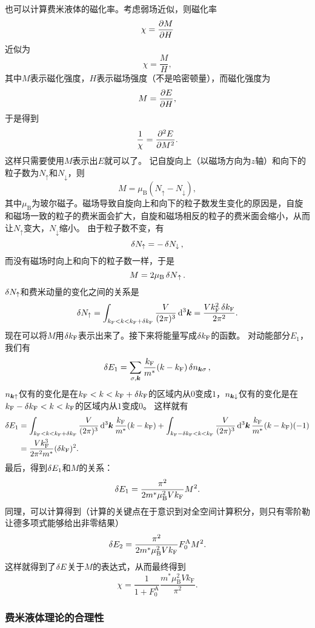 \documentclass[hyperref, UTF8, a4paper]{ctexart}
\begin{document}
也可以计算费米液体的磁化率。考虑弱场近似，则磁化率
\[
    \chi = \pdv{M}{H}
\]
近似为
\[
    \chi = \frac{M}{H},
\]
其中$M$表示磁化强度，$H$表示磁场强度（不是哈密顿量），而磁化强度为
\[
    M = \pdv{E}{H},
\]
于是得到
\[
    \frac{1}{\chi} = \pdv[2]{E}{M}.
\]
这样只需要使用$M$表示出$E$就可以了。
记自旋向上（以磁场方向为$z$轴）和向下的粒子数为$N_\uparrow$和$N_\downarrow$，则
\[
    M = \mu_\text{B} (N_\uparrow - N_\downarrow),
\]
其中$\mu_\text{B}$为玻尔磁子。磁场导致自旋向上和向下的粒子数发生变化的原因是，自旋和磁场一致的粒子的费米面会扩大，自旋和磁场相反的粒子的费米面会缩小，从而让$N_\uparrow$变大，$N_\downarrow$缩小。
由于粒子数不变，有
\[
    \var{N_\uparrow} = - \var{N_\downarrow},
\]
而没有磁场时向上和向下的粒子数一样，于是
\[
    M = 2 \mu_\text{B} \var{N}_\uparrow.
\]
$\var{N_\uparrow}$和费米动量的变化之间的关系是
\[
    \var{N_\uparrow} = \int_{k_\text{F} < k < k_\text{F} + \var{k_\text{F}}} \frac{V}{(2\pi)^3} \dd[3]{\vb*{k}} = \frac{V k_\text{F}^2 \var{k_\text{F}}}{2\pi^2}.
\]
现在可以将$M$用$\var{k_\text{F}}$表示出来了。接下来将能量写成$\var{k_\text{F}}$的函数。
对动能部分$E_1$，我们有
\[
    \var{E_1} = \sum_{\sigma, \vb*{k}} \frac{k_\text{F}}{m^*} (k - k_\text{F}) \var{n}_{\vb*{k} \sigma},
\]
$n_{\vb*{k} \uparrow}$仅有的变化是在$k_\text{F} < k < k_\text{F} + \var{k_\text{F}}$的区域内从$0$变成$1$，$n_{\vb*{k} \downarrow}$仅有的变化是在$k_\text{F} - \var{k_\text{F}} < k < k_\text{F}$的区域内从$1$变成$0$。
这样就有
\[
    \begin{aligned}
        \var{E_1} &= \int_{k_\text{F} < k < k_\text{F} + \var{k_\text{F}}} \frac{V}{(2\pi)^3} \dd[3]{\vb*{k}} \frac{k_\text{F}}{m^*} (k - k_\text{F}) + \int_{k_\text{F} - \var{k_\text{F}} < k < k_\text{F}} \frac{V}{(2\pi)^3} \dd[3]{\vb*{k}} \frac{k_\text{F}}{m^*} (k - k_\text{F}) (-1) \\
        &= \frac{V k_\text{F}^3}{2 \pi^2 m^*} (\var{k_\text{F}})^2.
    \end{aligned}
\]
最后，得到$\var{E_1}$和$M$的关系：
\[
    \var{E_1} = \frac{\pi^2}{2 m^* \mu_\text{B}^2 V k_\text{F}} M^2.
\]
同理，可以计算得到（计算的关键点在于意识到对全空间计算积分，则只有零阶勒让德多项式能够给出非零结果）
\[
    \var{E_2} = \frac{\pi^2}{2 m^* \mu_\text{B}^2 V k_\text{F}} F_0^\text{A} M^2.
\]
这样就得到了$\var{E}$关于$M$的表达式，从而最终得到
\begin{equation}
    \chi = \frac{1}{1 + F_0^\text{A}} \frac{m^* \mu_\text{B}^2 V k_\text{F}}{\pi^2}.
\end{equation}

\subsubsection{费米液体理论的合理性}
\end{document}
